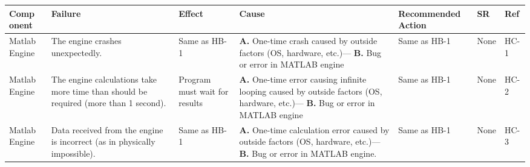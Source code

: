 \documentclass{article}
\begin{document}
      \begin{table}[H]
          \begin{tabular}{|p{} | p{} | p{} | p{} | p{} | p{} | p{}|}
          \toprule
          \textbf{Comp onent} & \textbf{Failure} & \textbf{Effect} & \textbf{Cause} & \textbf{Recommended Action} & \textbf{SR} & \textbf{Ref}\\
      \midrule
      Matlab Engine& The engine crashes unexpectedly.
      & Same as HB-1
      & \textbf{A.} One-time crash caused by outside factors (OS, hardware, etc.)---
        \textbf{B.} Bug or error in MATLAB engine      
      & Same as HB-1    
      &None&HC-1\\
      \midrule
      Matlab Engine& The engine calculations take more time than should be required (more than 1 second).
      & Program must wait for results
      & \textbf{A.} One-time error causing infinite looping caused by outside factors (OS, hardware, etc.)---
        \textbf{B.} Bug or error in MATLAB engine      
      & Same as HB-1    
      &None&HC-2\\
      \midrule
      Matlab Engine& Data received from the engine is incorrect (as in physically impossible).
      & Same as HB-1
      & \textbf{A.} One-time calculation error caused by outside factors (OS, hardware, etc.)---
        \textbf{B.} Bug or error in MATLAB engine.     
      & Same as HB-1    
      &None&HC-3\\
      \bottomrule
        \end{tabular}
        \end{table}
        \pagebreak
\end{document}
